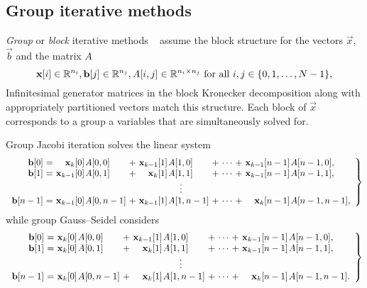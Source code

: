\subsection{Group iterative methods}
\label{sec:algorithms:group-jgs}

\emph{Group} or \emph{block} iterative methods%
~\citet[Section~10.4]{stewart2009probability} assume the block
structure for the vectors $\vec{x}$, $\vec{b}$ and the matrix $A$
\begin{equation}
  \bm{\mathrm{x}}[i] \in \mathbb{R}^{n_i}, \bm{\mathrm{b}}[j] \in \mathbb{R}^{n_j}, A[i, j] \in
  \mathbb{R}^{n_i \times n_j} \text{ for all $i, j \in \{0, 1, \ldots,
    N - 1\}$,}
\end{equation}
Infinitesimal generator matrices in the block Kronecker decomposition
along with appropriately partitioned vectors match this structure.
Each block of $\vec{x}$ corresponds to a group a variables that are
simultaneously solved for.

Group Jacobi iteration solves the linear system
{\small\begin{equation}
    \left.
      \begin{array}{r@{${} = {}$}*{2}{r@{\kern1pt}l@{${} + {}$}}c@{${} + {}$}r@{\kern1pt}l}
        \vec{b}[0] & \vec{x}_{k}[0] & A[0,0] & \vec{x}_{k - 1}[1] & A[1,0] & \cdots & \vec{x}_{k - 1}[n - 1] & A[n - 1,0] \text,\\
        \vec{b}[1] & \vec{x}_{k - 1}[0] & A[0,1] & \vec{x}_{k}[1] & A[1,1] & \cdots & \vec{x}_{k - 1}[n - 1] & A[n - 1,1] \text,\\
        \multicolumn{8}{c}{$\vdots$} \\
        \vec{b}[n - 1] & \vec{x}_{k - 1}[0] & A[0,n - 1] & \vec{x}_{k - 1}[1] & A[1,n - 1] & \cdots & \vec{x}_{k}[n - 1] & A[n - 1,n - 1] \text,\\
      \end{array}
    \right\}
  \end{equation}}%
while group Gauss--Seidel considers
{\small\begin{equation}
    \left.
      \begin{array}{r@{${} = {}$}*{2}{r@{\kern1pt}l@{${} + {}$}}c@{${} + {}$}r@{\kern1pt}l}
        \vec{b}[0] & \vec{x}_{k}[0] & A[0,0] & \vec{x}_{k - 1}[1] & A[1,0] & \cdots & \vec{x}_{k - 1}[n - 1] & A[n - 1,0] \text,\\
        \vec{b}[1] & \vec{x}_{k}[0] & A[0,1] & \vec{x}_{k}[1] & A[1,1] & \cdots & \vec{x}_{k - 1}[n - 1] & A[n - 1,1] \text,\\
        \multicolumn{8}{c}{$\vdots$} \\
        \vec{b}[n - 1] & \vec{x}_{k}[0] & A[0,n - 1] & \vec{x}_{k}[1] & A[1,n - 1] & \cdots & \vec{x}_{k}[n - 1] & A[n - 1,n - 1] \text.\\
      \end{array}
    \right\}
  \end{equation}}

